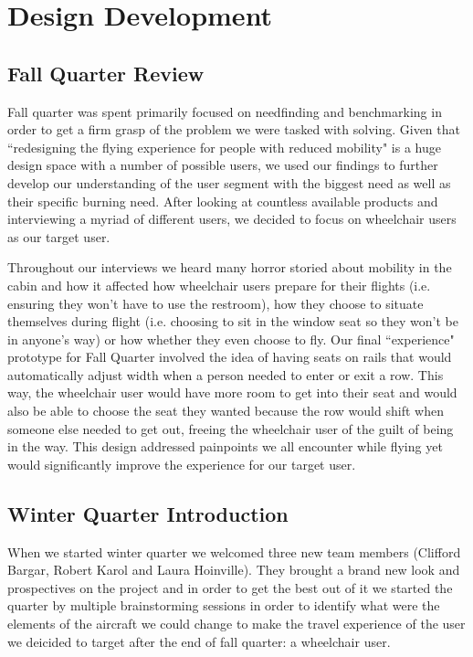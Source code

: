 \chapter{Design Development}

\section{Fall Quarter Review}
Fall quarter was spent primarily focused on needfinding and benchmarking in order to get a firm grasp of the problem we were tasked with solving. Given that ``redesigning the flying experience for people with reduced mobility" is a huge design space with a number of possible users, we used our findings to further develop our understanding of the user segment with the biggest need as well as their specific burning need. After looking at countless available products and interviewing a myriad of different users, we decided to focus on wheelchair users as our target user. 

Throughout our interviews we heard many horror storied about mobility in the cabin and how it affected how wheelchair users prepare for their flights (i.e. ensuring they won't have to use the restroom), how they choose to situate themselves during flight (i.e. choosing to sit in the window seat so they won't be in anyone's way) or how whether they even choose to fly. Our final ``experience" prototype for Fall Quarter involved the idea of having seats on rails that would automatically adjust width when a person needed to enter or exit a row. This way, the wheelchair user would have more room to get into their seat and would also be able to choose the seat they wanted because the row would shift when someone else needed to get out, freeing the wheelchair user of the guilt of being in the way. This design addressed painpoints we all encounter while flying yet would significantly improve the experience for our target user. 

\section{Winter Quarter Introduction}
When we started winter quarter we welcomed three new team members (Clifford Bargar, Robert Karol and Laura Hoinville). They brought a brand new look and prospectives on the project and in order to get the best out of it we started the quarter by multiple brainstorming sessions in order to identify what were the elements of the aircraft we could change to make the travel experience of the user we deicided to target after the end of fall quarter: a wheelchair user. 

